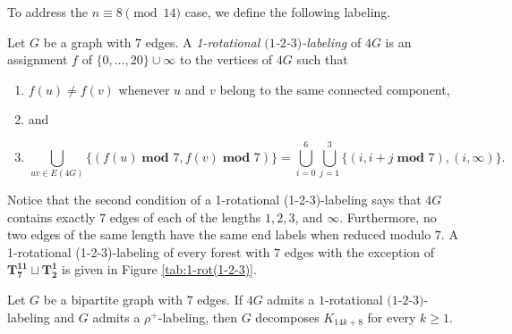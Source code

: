 To address the $n \equiv 8 \pmod{14}$ case, we define the following labeling.
\begin{definition}\label{def:1-2-3-1-rot}
    Let $G$ be a graph with $7$ edges. A \emph{1-rotational $(1$-$2$-$3)$-labeling} of $4G$ is an assignment $f$ of $\{0,\dots,20\} \cup \infty$ to the vertices of $4G$ such that
    \begin{enumerate}
        \item $f(u) \neq f(v)$ whenever $u$ and $v$ belong to the same connected component, 
        \item[] and
        \item  $$ \bigcup_{uv\in E(4G)} \{(f(u)\; \textbf{mod } 7,f(v)\; \textbf{mod } 7)\}= \bigcup_{i=0}^{6} \bigcup_{j=1}^{3} \{(i,i+j \; \textbf{mod } 7), (i,\infty)\}.$$
    \end{enumerate}
\end{definition}
Notice that the second condition of a 1-rotational (1-2-3)-labeling says that $4G$ contains exactly $7$ edges of each of the lengths $1,2,3$, and $\infty$. Furthermore, no two edges of the same length have the same end labels when reduced modulo $7.$ A 1-rotational (1-2-3)-labeling of every forest with $7$ edges with the exception of $\mathbf{T_{7}^{11}}\sqcup\mathbf{T_{2}^{1}}$ is given in Figure \ref{tab:1-rot(1-2-3)}. 

\begin{thm}\label{thm:1-2-3 1-rot plus rho}
    Let $G$ be a bipartite graph with $7$ edges. If $4G$ admits a $1$-rotational  $(1$-$2$-$3)$-labeling and $G$ admits a $\rho^{+}$-labeling, then $G$ decomposes $K_{14k+8}$ for every $k\geq1.$
\end{thm}

